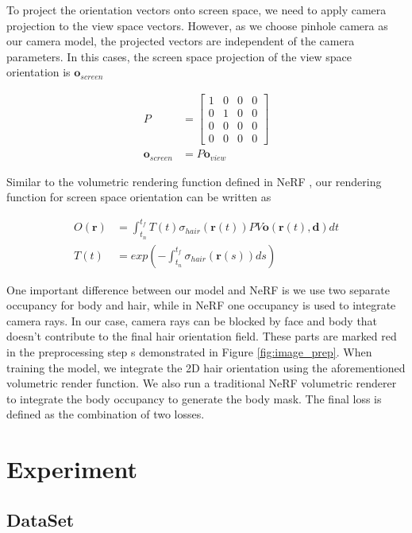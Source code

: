 \documentclass[12pt]{article}
\begin{document}
    To project the orientation vectors onto screen space, we need to apply camera projection to the view space vectors. However, as we choose pinhole camera as our camera model, the projected vectors are independent of the camera parameters. In this cases, the screen space projection of the view space orientation is $\mathbf{o}_{screen}$

    \begin{align}
        P &= \begin{bmatrix}
            1 & 0 & 0 & 0 \\
            0 & 1 & 0 & 0 \\
            0 & 0 & 0 & 0 \\
            0 & 0 & 0 & 0
        \end{bmatrix} \\
        \mathbf{o}_{screen} &= P\mathbf{o}_{view}
    \end{align}

    Similar to the volumetric rendering function defined in NeRF \cite{mildenhall_nerf_2020}, our rendering function for screen space orientation can be written as

    \begin{align}
        O(\mathbf{r}) &= \int_{t_{n}}^{t_{f}} T(t) \sigma_{hair}(\mathbf{r}(t)) P V \mathbf{o}(\mathbf{r}(t), \mathbf{d}) dt \\
        T(t) &= exp(-\int_{t_{n}}^{t_{f}} \sigma_{hair}(\mathbf{r}(s)) ds)
    \end{align}

    One important difference between our model and NeRF is we use two separate occupancy for body and hair, while in NeRF one occupancy is used to integrate camera rays. In our case, camera rays can be blocked by face and body that doesn't contribute to the final hair orientation field. These parts are marked red in the preprocessing step s demonstrated in Figure \ref{fig:image_prep}. When training the model, we integrate the 2D hair orientation using the aforementioned volumetric render function. We also run a traditional NeRF volumetric renderer to integrate the body occupancy to generate the body mask. The final loss is defined as the combination of two losses.
    
  \section{Experiment}

  \subsection{DataSet}
\end{document}
